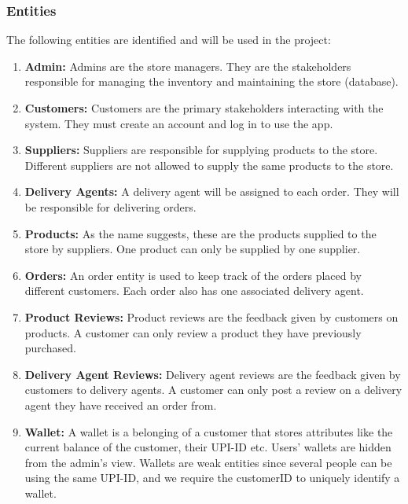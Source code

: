 \documentclass[12pt]{report}
\begin{document}
    \subsubsection*{Entities}
        The following entities are identified and will be used in the project:
        \begin{enumerate}
            \item \textbf{Admin:}
            Admins are the store managers.
            They are the stakeholders responsible for managing the inventory and maintaining the store (database).
            \item \textbf{Customers:}
            Customers are the primary stakeholders interacting with the system.
            They must create an account and log in to use the app.
            \item \textbf{Suppliers:}
            Suppliers are responsible for supplying products to the store.
            Different suppliers are not allowed to supply the same products to the store.
            \item \textbf{Delivery Agents:}
            A delivery agent will be assigned to each order.
            They will be responsible for delivering orders.
            \item \textbf{Products:}
            As the name suggests, these are the products supplied to the store by suppliers.
            One product can only be supplied by one supplier.
            \item \textbf{Orders:}
            An order entity is used to keep track of the orders placed by different customers.
            Each order also has one associated delivery agent.
            \item \textbf{Product Reviews:}
            Product reviews are the feedback given by customers on products.
            A customer can only review a product they have previously purchased.
            \item \textbf{Delivery Agent Reviews:}
            Delivery agent reviews are the feedback given by customers to delivery agents.
            A customer can only post a review on a delivery agent they have received an order from.
            \item \textbf{Wallet:}
            A wallet is a belonging of a customer that stores attributes like the current balance of the customer, their UPI-ID etc.
            Users' wallets are hidden from the admin's view. Wallets are weak entities since several people can be using the same UPI-ID, and we require the customerID to uniquely identify a wallet.
        \end{enumerate}
\end{document}
